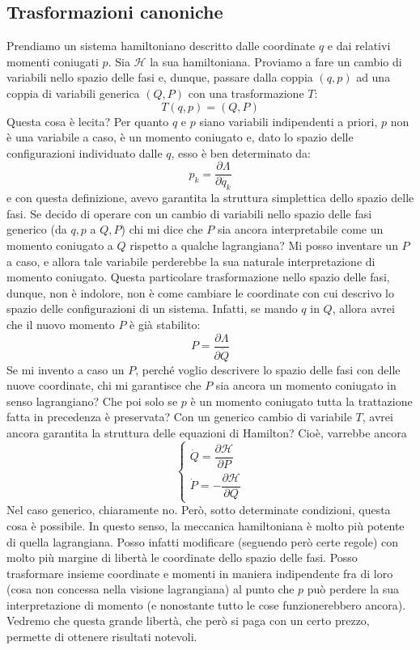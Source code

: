 \documentclass[a4paper,openany]{article}
\begin{document}
\subsection{Trasformazioni canoniche}
Prendiamo un sistema hamiltoniano descritto dalle coordinate $q$ e dai relativi momenti coniugati $p$. Sia $\mathcal{H}$ la sua hamiltoniana. Proviamo a fare un cambio di variabili nello spazio delle fasi e, dunque, passare dalla coppia $(q,p)$ ad una coppia di variabili generica $(Q,P)$ con una trasformazione $T$:
$$
T(q,p) = (Q,P)
$$
Questa cosa è lecita? Per quanto $q$ e $p$ siano variabili indipendenti a priori, $p$ non è una variabile a caso, è un momento coniugato e, dato lo spazio delle configurazioni individuato dalle $q$, esso è ben determinato da:
$$
p_k = \dfrac{\partial \Lambda}{\partial \dot{q}_k}
$$
e con questa definizione, avevo garantita la struttura simplettica dello spazio delle fasi. Se decido di operare con un cambio di variabili nello spazio delle fasi generico (da $q,p$ a $Q,P$) chi mi dice che $P$ sia ancora interpretabile come un momento coniugato a $Q$ rispetto a qualche lagrangiana? Mi posso inventare un $P$ a caso, e allora tale variabile perderebbe la sua naturale interpretazione di momento coniugato. Questa particolare trasformazione nello spazio delle fasi, dunque, non è indolore, non è come cambiare le coordinate con cui descrivo lo spazio delle configurazioni di un sistema. Infatti, se mando $q$ in $Q$, allora avrei che il nuovo momento $P$ è già stabilito:
$$
P = \dfrac{\partial \Lambda}{\partial \dot{Q}}
$$ 
Se mi invento a caso un $P$, perché voglio descrivere lo spazio delle fasi con delle nuove coordinate, chi mi garantisce che $P$ sia ancora un momento coniugato in senso lagrangiano? Che poi solo se $p$ è un momento coniugato tutta la trattazione fatta in precedenza è preservata? Con un generico cambio di variabile $T$, avrei ancora garantita la struttura delle equazioni di Hamilton? Cioè, varrebbe ancora
\begin{equation}\label{key}
	\begin{cases}
		\dot{Q} = \dfrac{\partial \mathcal{H}}{\partial P} \\
		\dot{P} =- \dfrac{\partial \mathcal{H}}{\partial Q}
	\end{cases}
\end{equation}
Nel caso generico, chiaramente no. Però, sotto determinate condizioni, questa cosa è possibile. In questo senso, la meccanica hamiltoniana è molto più potente di quella lagrangiana. Posso infatti modificare (seguendo però certe regole) con molto più margine di libertà le coordinate dello spazio delle fasi. Posso trasformare insieme coordinate e momenti in maniera indipendente fra di loro (cosa non concessa nella visione lagrangiana) al punto che $p$ può perdere la sua interpretazione di momento (e nonostante tutto le cose funzionerebbero ancora). Vedremo che questa grande libertà, che però si paga con un certo prezzo, permette di ottenere risultati notevoli.
\end{document}
